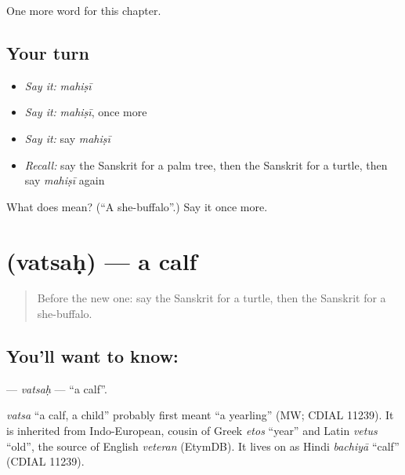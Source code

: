 \begin{grammarlens}[title={What you've built}]
One more word for this chapter.
\end{grammarlens}

\subsection*{Your turn}
\begin{itemize}
\raggedright
  \item \emph{Say it:} \emph{mahiṣī}
  \item \emph{Say it:} \emph{mahiṣī}, once more
  \item \emph{Say it:} say \emph{mahiṣī}
  \item \emph{Recall:} say the Sanskrit for a palm tree, then the Sanskrit for a turtle, then say \emph{mahiṣī} again
\end{itemize}

\begin{tcolorbox}[breakable,colback=teal!4,colframe=teal!35!black,title={Before you move on}]
What does  mean? (\textquotedblleft{}A she-buffalo\textquotedblright{}.) Say it once more.
\end{tcolorbox}
\section[\texorpdfstring{\sk{वत्सः} (vatsaḥ)}{वत्सः (vatsaḥ)}]{ (vatsaḥ) — a calf}

\label{lesson:SA-C167-vatsah}



\begin{quote}
Before the new one: say the Sanskrit for a turtle, then the Sanskrit for a she-buffalo.
\end{quote}

\subsection*{You'll want to know: }
\textbf{} — \emph{vatsaḥ} — \textquotedblleft{}a calf\textquotedblright{}.

\begin{cousinweb}
\emph{vatsa} \textquotedblleft{}a calf, a child\textquotedblright{} probably first meant \textquotedblleft{}a yearling\textquotedblright{} (MW; CDIAL 11239). It is inherited from Indo-European, cousin of Greek \emph{etos} \textquotedblleft{}year\textquotedblright{} and Latin \emph{vetus} \textquotedblleft{}old\textquotedblright{}, the source of English \emph{veteran} (EtymDB). It lives on as Hindi \emph{bachiyā} \textquotedblleft{}calf\textquotedblright{} (CDIAL 11239).
\end{cousinweb}

